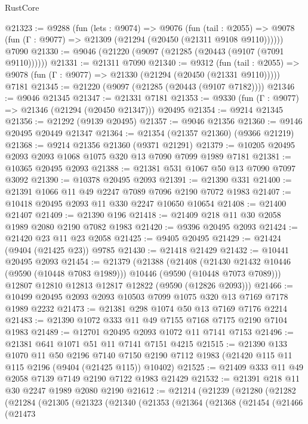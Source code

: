 \begin{lexlean}{RustCore}
\begin{coremodule}
@21323 := @9288
    (fun (lets : @9074) =>
    @9076
      (fun (tail : @2055) =>
      @9078 (fun (Γ : @9077) => @21309 (@21294 (@20450 (@21311 @9108 @9110))))))
    @7090
@21330 := @9046 (@21220 (@9097 (@21285 (@20443 (@9107 (@7091 @9110))))))
@21331 := @21311 @7090
@21340 := @9312
    (fun (tail : @2055) => @9078 (fun (Γ : @9077) => @21330 (@21294 (@20450 (@21331 @9110)))))
    @7181
@21345 := @21220 (@9097 (@21285 (@20443 (@9107 @7182))))
@21346 := @9046 @21345
@21347 := @21331 @7181
@21353 := @9330 (fun (Γ : @9077) => @21346 (@21294 (@20450 @21347))) @20495
@21354 := @9214 @21345
@21356 := @21292 (@9139 @20495)
@21357 := @9046 @21356
@21360 := @9146 @20495 @20449 @21347
@21364 := @21354 (@21357 @21360) (@9366 @21219)
@21368 := @9214 @21356 @21360 (@9371 @21291)
@21379 := @10205 @20495 @2093 @2093 @1068 @1075 @320 @13 @7090 @7099 @1989 @7181
@21381 := @10365 @20495 @2093
@21388 := @21381 @531 @1067 @50 @13 @7090 @7097 @3092
@21390 := @10378 @20495 @2093
@21391 := @21390 @331
@21400 := @21391 @1066 @11 @49 @2247 @7089 @7096 @2190 @7072 @1983
@21407 := @10418 @20495 @2093 @11 @330 @2247 @10650 @10654
@21408 := @21400 @21407
@21409 := @21390 @196
@21418 := @21409 @218 @11 @30 @2058 @1989 @2080 @2190 @7082 @1983
@21420 := @9396 @20495 @2093
@21424 := @21420 @23 @11 @23 @2058
@21425 := @9405 @20495
@21429 := @21424 (@9404 (@21425 @23)) @9785
@21430 := @21418 @21429
@21432 := @10441 @20495 @2093
@21454 := @21379
    (@21388
      (@21408
        (@21430 @21432 @10446 (@9590 (@10448 @7083 @1989)))
        @10446
        (@9590 (@10448 @7073 @7089)))
      @12807
      @12810
      @12813
      @12817
      @12822
      (@9590 (@12826 @2093)))
@21466 := @10499 @20495 @2093 @2093 @10503 @7099 @1075 @320 @13 @7169 @7178 @1989 @2232
@21473 := @21381 @298 @1074 @50 @13 @7169 @7176 @2214
@21483 := @21390 @1072 @333 @11 @49 @7155 @7168 @7175 @2190 @7104 @1983
@21489 := @12701 @20495 @2093 @1072 @11 @7141 @7153
@21496 := @21381 @641 @1071 @51 @11 @7141 @7151 @4215
@21515 := @21390
    @133
    @1070
    @11
    @50
    @2196
    @7140
    @7150
    @2190
    @7112
    @1983
    (@21420 @115 @11 @115 @2196 (@9404 (@21425 @115)) @10402)
@21525 := @21409 @333 @11 @49 @2058 @7139 @7149 @2190 @7122 @1983 @21429
@21532 := @21391 @218 @11 @30 @2247 @1989 @2080 @2190
@21612 := @21214
    (@21239
      (@21280
        (@21282
          (@21284
            (@21305
              (@21323
                (@21340
                  (@21353
                    (@21364
                      (@21368
                        (@21454
                          (@21466
                            (@21473

\end{coremodule}
\end{lexlean}
